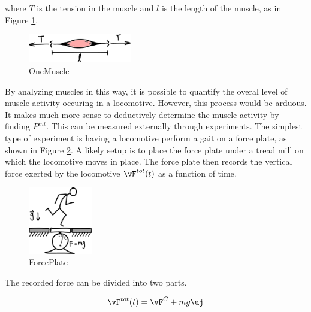 where $T$ is the tension in the muscle and $l$ is the length of the muscle, as in Figure \ref{fig:OneMuscle}.

\begin{figure}[h]		%
\begin{centering}
\includegraphics[width=0.4\textwidth]{Figures/OneMuscle}\par
\end{centering}
\caption{OneMuscle}
\label{fig:OneMuscle}
\end{figure}
%

By analyzing muscles in this way, it is possible to quantify the overal level of muscle activity occuring in a locomotive. However, this process would be arduous. It makes much more sense to deductively determine the muscle activity by finding $P^{int}$. This can be measured externally through experiments. The simplest type of experiment is having a locomotive perform a gait on a force plate, as shown in Figure \ref{fig:ForcePlate}. A likely setup is to place the force plate under a tread mill on which the locomotive moves in place. The force plate then records the vertical force exerted by the locomotive $\vF^{tot}(t)$ as a function of time.

\begin{figure}[h]		%
\begin{centering}
\includegraphics[width=0.25\textwidth]{Figures/ForcePlate}\par
\end{centering}
\caption{ForcePlate}
\label{fig:ForcePlate}
\end{figure}
%

The recorded force can be divided into two parts.

\begin{equation}
\vF^{tot}(t) = \vF^{G} + mg \uj
\end{equation}

